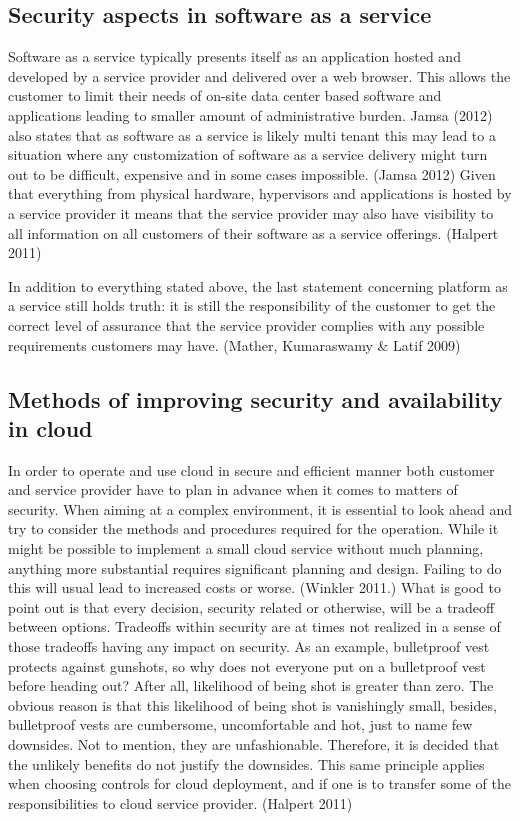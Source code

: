 \documentclass{article}
\begin{document}
\subsection{Security aspects in software as a service}
Software as a service typically presents itself as an application hosted and developed by a service provider and delivered over a web browser. This allows the customer to limit their needs of on-site data center based software and applications leading to smaller amount of administrative burden. Jamsa (2012) also states that as software as a service is likely multi tenant this may lead to a situation where any customization of software as a service delivery might turn out to be difficult, expensive and in some cases impossible. (Jamsa 2012)
Given that everything from physical hardware, hypervisors and applications is hosted by a service provider it means that the service provider may also have visibility to all information on all customers of their software as a service offerings. (Halpert 2011)
\par
In addition to everything stated above, the last statement concerning platform as a service still holds truth: it is still the responsibility of the customer to get the correct level of assurance that the service provider complies with any possible requirements customers may have. (Mather, Kumaraswamy \& Latif 2009)

\subsection{Methods of improving security and availability in cloud}
In order to operate and use cloud in secure and efficient manner both customer and service provider have to plan in advance when it comes to matters of security. When aiming at a complex environment, it is essential to look ahead and try to consider the methods and procedures required for the operation. While it might be possible to implement a small cloud service without much planning, anything more substantial requires significant planning and design. Failing to do this will usual lead to increased costs or worse. (Winkler 2011.)
What is good to point out is that every decision, security related or otherwise, will be a tradeoff between options. Tradeoffs within security are at times not realized in a sense of those tradeoffs having any impact on security. As an example, bulletproof vest protects against gunshots, so why does not everyone put on a bulletproof vest before heading out? After all, likelihood of being shot is greater than zero. The obvious reason is that this likelihood of being shot is vanishingly small, besides, bulletproof vests are cumbersome, uncomfortable and hot, just to name few downsides. Not to mention, they are unfashionable. Therefore, it is decided that the unlikely benefits do not justify the downsides. This same principle applies when choosing controls for cloud deployment, and if one is to transfer some of the responsibilities to cloud service provider.  (Halpert 2011) 
\end{document}
